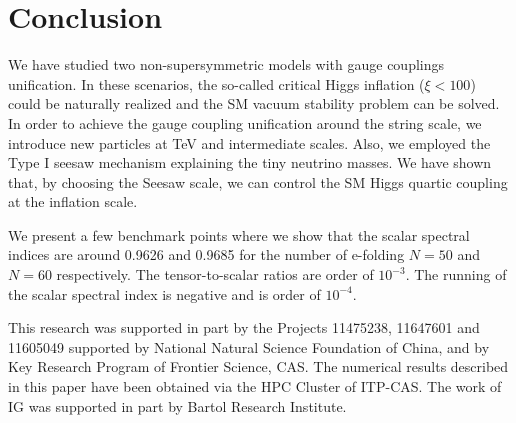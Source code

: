 \documentclass[aps,prd,preprint,superscriptaddress,showpacs,ctexart]{revtex4-1}
\begin{document}

\section{Conclusion}

We have studied two non-supersymmetric models with gauge couplings unification. 
In these scenarios, the so-called critical Higgs inflation  ($\xi<100$) could be naturally realized 
and the SM vacuum stability problem can be solved. 
In order to achieve the gauge coupling unification around the string scale, 
we introduce new particles at TeV and intermediate scales.
Also, we employed the
Type I seesaw mechanism explaining the tiny neutrino masses. We have
shown that, by choosing the Seesaw scale, we can control
the SM Higgs quartic coupling at the inflation scale. 

We present a few benchmark points where we show that the scalar spectral indices
are around 0.9626 and 0.9685 for the number of e-folding
$N=50$ and $N=60$ respectively. The tensor-to-scalar ratios are order
of $10^{-3}$. The running of the scalar spectral index is negative
and is order of $10^{-4}$.

\begin{acknowledgments}
This research was supported in part by the Projects 11475238, 11647601 and 11605049 supported by National Natural Science Foundation of China,
and by Key Research Program of Frontier Science, CAS. The numerical
results described in this paper have been obtained via the HPC Cluster
of ITP-CAS. The work of IG was supported in part by Bartol Research
Institute.
\end{acknowledgments}



\appendix
\end{document}

